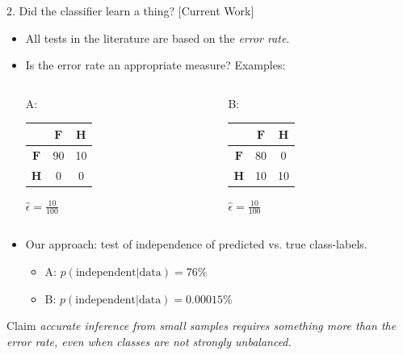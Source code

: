 \documentclass{beamer}
\begin{document}
\begin{frame}{2. Did the classifier learn a thing? $[$Current Work$]$}
  \begin{itemize}
  \item All tests in the literature are based on the \emph{error
      rate}.
  \item Is the error rate an appropriate measure? Examples:

\begin{columns}
    \begin{column}{5cm}
    \begin{center}
      A:
      \begin{tabular}{ c || c | c | }
            & $\mathbf{F}$ & $\mathbf{H}$ \\
        \hline
        \hline
          \textcolor{Grey_c}{$\mathbf{F}$} & 90 & \alert{10} \\
        \hline
          \textcolor{Grey_c}{$\mathbf{H}$} &  \alert{0} &  0 \\
        \hline
      \end{tabular}
      $\hat{\epsilon}=\frac{10}{100}$
    \end{center}
    \end{column}
    \begin{column}{5cm}
    \begin{center}
      B:
      \begin{tabular}{ c || c | c | }
            & $\mathbf{F}$ & $\mathbf{H}$ \\
        \hline
        \hline
          \textcolor{Grey_c}{$\mathbf{F}$} & 80 &  \alert{0} \\
        \hline
          \textcolor{Grey_c}{$\mathbf{H}$} & \alert{10} & 10 \\
        \hline
      \end{tabular}
      $\hat{\epsilon}=\frac{10}{100}$
    \end{center}
    \end{column}
  \end{columns}



\item Our approach: test of independence of predicted vs. true
  class-labels.%
    \begin{itemize}
    \item A: $p(\text{independent}|\text{data}) = 76\%$
    \item B: $p(\text{independent}|\text{data}) = 0.00015\%$
    \end{itemize}
  \end{itemize}
  \begin{block}{Claim}
    \emph{accurate inference from small samples requires
      something more than the error rate, even when classes are not
      strongly unbalanced.}
  \end{block}
\end{frame}
\end{document}
